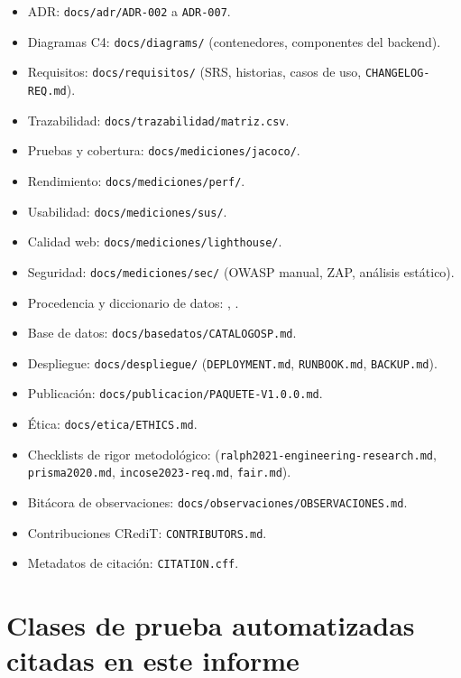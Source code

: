 \begin{itemize}[nosep]
  \item ADR: \texttt{docs/adr/ADR-002} a \texttt{ADR-007}.
  \item Diagramas C4: \texttt{docs/diagrams/} (contenedores, componentes del backend).
  \item Requisitos: \texttt{docs/requisitos/} (SRS, historias, casos de uso, \texttt{CHANGELOG-REQ.md}).
  \item Trazabilidad: \texttt{docs/trazabilidad/matriz.csv}.
  \item Pruebas y cobertura: \texttt{docs/mediciones/jacoco/}.
  \item Rendimiento: \texttt{docs/mediciones/perf/}.
  \item Usabilidad: \texttt{docs/mediciones/sus/}.
  \item Calidad web: \texttt{docs/mediciones/lighthouse/}.
  \item Seguridad: \texttt{docs/mediciones/sec/} (OWASP manual, ZAP, an\'alisis est\'atico).
  \item Procedencia y diccionario de datos: , .
  \item Base de datos: \texttt{docs/basedatos/CATALOGOSP.md}.
  \item Despliegue: \texttt{docs/despliegue/} (\texttt{DEPLOYMENT.md}, \texttt{RUNBOOK.md}, \texttt{BACKUP.md}).
  \item Publicaci\'on: \texttt{docs/publicacion/PAQUETE-V1.0.0.md}.
  \item \'Etica: \texttt{docs/etica/ETHICS.md}.
  \item Checklists de rigor metodol\'ogico:  (\texttt{ralph2021-\allowbreak engineering-\allowbreak research.md}, \texttt{prisma2020.md}, \texttt{incose2023-req.md}, \texttt{fair.md}).
  \item Bit\'acora de observaciones: \texttt{docs/observaciones/OBSERVACIONES.md}.
  \item Contribuciones CRediT: \texttt{CONTRIBUTORS.md}.
  \item Metadatos de citaci\'on: \texttt{CITATION.cff}.
\end{itemize}

\section{Clases de prueba automatizadas citadas en este informe}

